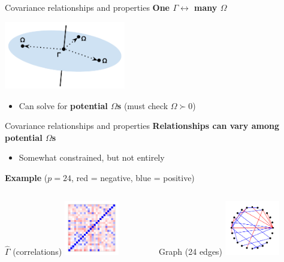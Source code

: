 \documentclass[professionalfonts]{beamer}
\begin{document}
\begin{frame}{Covariance relationships and properties}
\textbf{One $\Gamma \leftrightarrow$ many $\Omega$}
\begin{center}
\includegraphics[width=200px]{figs/matrix-explore.pdf}
\end{center}
\begin{itemize}
\item Can solve for \textbf{potential $\Omega$s} (must check $\Omega \succ 0$)
\end{itemize}
\end{frame}

\begin{frame}{Covariance relationships and properties}
\textbf{Relationships can vary among potential $\Omega$s}
\begin{itemize}
\item Somewhat constrained, but not entirely
\end{itemize}
\textbf{Example} ($p = 24$, {\color{red} red} = negative, {\color{blue} blue} = positive)
\begin{columns}
\begin{column}{0.45\textwidth}
\begin{center}
$\widehat{\Gamma}$ (correlations)
\includegraphics[width=90px]{figs/example-clr-cor.pdf}
\end{center}
\end{column}
\begin{column}{0.45\textwidth}
\begin{center}
Graph (24 edges)
\includegraphics[width=90px]{figs/example-clr-graph.pdf}
\end{center}
\end{column}
\end{columns}
\end{frame}
\end{document}
